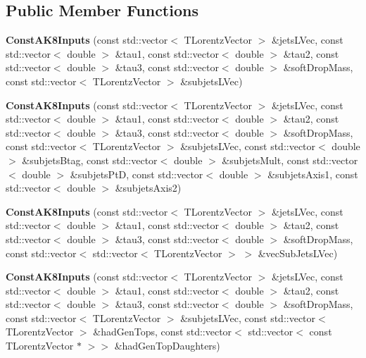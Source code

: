 \subsection*{Public Member Functions}
\begin{DoxyCompactItemize}
\item 
\hypertarget{classttUtility_1_1ConstAK8Inputs_a0f8cfcf1305dd45f8694d1d4172f2766}{{\bfseries Const\-A\-K8\-Inputs} (const std\-::vector$<$ T\-Lorentz\-Vector $>$ \&jets\-L\-Vec, const std\-::vector$<$ double $>$ \&tau1, const std\-::vector$<$ double $>$ \&tau2, const std\-::vector$<$ double $>$ \&tau3, const std\-::vector$<$ double $>$ \&soft\-Drop\-Mass, const std\-::vector$<$ T\-Lorentz\-Vector $>$ \&subjets\-L\-Vec)}\label{classttUtility_1_1ConstAK8Inputs_a0f8cfcf1305dd45f8694d1d4172f2766}

\item 
\hypertarget{classttUtility_1_1ConstAK8Inputs_a97223b6b84a2899e99fcb50d369b483d}{{\bfseries Const\-A\-K8\-Inputs} (const std\-::vector$<$ T\-Lorentz\-Vector $>$ \&jets\-L\-Vec, const std\-::vector$<$ double $>$ \&tau1, const std\-::vector$<$ double $>$ \&tau2, const std\-::vector$<$ double $>$ \&tau3, const std\-::vector$<$ double $>$ \&soft\-Drop\-Mass, const std\-::vector$<$ T\-Lorentz\-Vector $>$ \&subjets\-L\-Vec, const std\-::vector$<$ double $>$ \&subjets\-Btag, const std\-::vector$<$ double $>$ \&subjets\-Mult, const std\-::vector$<$ double $>$ \&subjets\-Pt\-D, const std\-::vector$<$ double $>$ \&subjets\-Axis1, const std\-::vector$<$ double $>$ \&subjets\-Axis2)}\label{classttUtility_1_1ConstAK8Inputs_a97223b6b84a2899e99fcb50d369b483d}

\item 
\hypertarget{classttUtility_1_1ConstAK8Inputs_a1a00ffaf521c7308969d6bf31fb683f4}{{\bfseries Const\-A\-K8\-Inputs} (const std\-::vector$<$ T\-Lorentz\-Vector $>$ \&jets\-L\-Vec, const std\-::vector$<$ double $>$ \&tau1, const std\-::vector$<$ double $>$ \&tau2, const std\-::vector$<$ double $>$ \&tau3, const std\-::vector$<$ double $>$ \&soft\-Drop\-Mass, const std\-::vector$<$ std\-::vector$<$ T\-Lorentz\-Vector $>$ $>$ \&vec\-Sub\-Jets\-L\-Vec)}\label{classttUtility_1_1ConstAK8Inputs_a1a00ffaf521c7308969d6bf31fb683f4}

\item 
\hypertarget{classttUtility_1_1ConstAK8Inputs_a2ac576a4f54d10d841172c34ed955f0c}{{\bfseries Const\-A\-K8\-Inputs} (const std\-::vector$<$ T\-Lorentz\-Vector $>$ \&jets\-L\-Vec, const std\-::vector$<$ double $>$ \&tau1, const std\-::vector$<$ double $>$ \&tau2, const std\-::vector$<$ double $>$ \&tau3, const std\-::vector$<$ double $>$ \&soft\-Drop\-Mass, const std\-::vector$<$ T\-Lorentz\-Vector $>$ \&subjets\-L\-Vec, const std\-::vector$<$ T\-Lorentz\-Vector $>$ \&had\-Gen\-Tops, const std\-::vector$<$ std\-::vector$<$ const T\-Lorentz\-Vector $\ast$ $>$$>$ \&had\-Gen\-Top\-Daughters)}\label{classttUtility_1_1ConstAK8Inputs_a2ac576a4f54d10d841172c34ed955f0c}


\end{DoxyCompactItemize}
